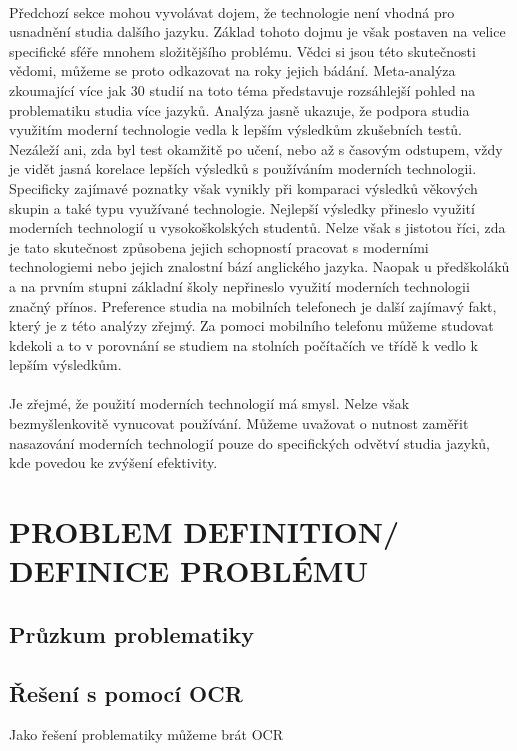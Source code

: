 \documentclass[journal]{IEEEtran}
\begin{document}
\paragraph{}
Předchozí sekce mohou vyvolávat dojem, že technologie není vhodná pro usnadnění studia dalšího jazyku. Základ tohoto dojmu je však postaven na velice specifické sféře mnohem složitějšího problému. Vědci si jsou této skutečnosti vědomi, můžeme se proto odkazovat na roky jejich bádání.
Meta-analýza zkoumající více jak 30 studií na toto téma představuje rozsáhlejší pohled na problematiku studia více jazyků\cite{technology_vocab}. Analýza jasně ukazuje, že podpora studia využitím moderní technologie vedla k lepším výsledkům zkušebních testů. Nezáleží ani, zda byl test okamžitě po učení, nebo až s časovým odstupem, vždy je vidět jasná korelace lepších výsledků s používáním moderních technologii. Specificky zajímavé poznatky však vynikly při komparaci výsledků věkových skupin a také typu využívané technologie. Nejlepší výsledky přineslo využití moderních technologií u vysokoškolských studentů.
Nelze však s jistotou říci, zda je tato skutečnost způsobena jejich schopností pracovat s moderními technologiemi nebo jejich znalostní bází anglického jazyka.
Naopak u předškoláků a na prvním stupni základní školy nepřineslo využití moderních technologii značný přínos.
Preference studia na mobilních telefonech je další zajímavý fakt, který je z této analýzy zřejmý.
Za pomoci mobilního telefonu můžeme studovat kdekoli a to v porovnání se studiem na stolních počítačích ve třídě k vedlo k lepším výsledkům.

\paragraph{}
Je zřejmé, že použití moderních technologií má smysl.
Nelze však bezmyšlenkovitě vynucovat používání.
Můžeme uvažovat o nutnost zaměřit nasazování moderních technologií pouze do specifických odvětví studia jazyků, kde povedou ke zvýšení efektivity.

\section{PROBLEM DEFINITION/ DEFINICE PROBLÉMU}

\subsection{Průzkum problematiky}

\subsection{Řešení s pomocí OCR}
Jako řešení problematiky můžeme brát \ac{OCR}
\end{document}
